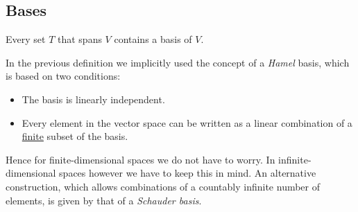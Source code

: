 
\subsection{Bases}

    \begin{result}
        Every set $T$ that spans $V$ contains a basis of $V$.
    \end{result}

    \begin{remark}
        In the previous definition we implicitly used the concept of a \textit{Hamel} basis, which is based on two conditions:
        \begin{itemize}
            \item The basis is linearly independent.
            \item Every element in the vector space can be written as a linear combination of a \underline{finite} subset of the basis.
        \end{itemize}
        Hence for finite-dimensional spaces we do not have to worry. In infinite-dimensional spaces however we have to keep this in mind. An alternative construction, which allows combinations of a countably infinite number of elements, is given by that of a \textit{Schauder basis}.
    \end{remark}

